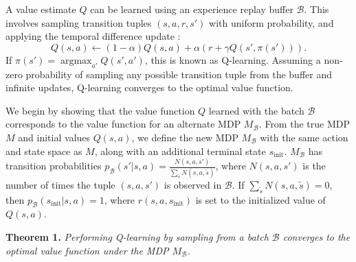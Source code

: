 \documentclass{article}
\newcommand{\y}{\gamma}
\newcommand{\al}{\alpha}
\newcommand{\lp}{\left (}
\newcommand{\rp}{\right )}
\newcommand{\B}{\mathcal{B}}
\DeclareMathOperator*{\argmax}{argmax}
\begin{document}

A value estimate $Q$ can be learned using an experience replay buffer $\B$. This involves sampling transition tuples $(s,a,r,s')$ with uniform probability, and applying the temporal difference update \cite{sutton1988tdlearning, watkins1989qlearning}:
\begin{equation}
Q(s,a) \leftarrow (1 - \al) Q(s,a) + \al \lp r + \y Q(s',\pi(s')) \rp.
\end{equation}
If $\pi(s') = \argmax_{a'} Q(s',a')$, this is known as Q-learning. 
Assuming a non-zero probability of sampling any possible transition tuple from the buffer and infinite updates, Q-learning converges to the optimal value function. 

We begin by showing that the value function $Q$ learned with the batch $\B$ corresponds to the value function for an alternate MDP $M_\B$. From the true MDP $M$ and initial values $Q(s,a)$, we define the new MDP $M_\B$ with the same action and state space as $M$, along with an additional terminal state $s_\text{init}$. $M_\B$ has transition probabilities $p_\B(s'|s,a) = \frac{N(s,a,s')}{\sum_{\tilde s} N(s,a,\tilde s)}$, where $N(s,a,s')$ is the number of times the tuple $(s,a,s')$ is observed in $\B$. If $\sum_{\tilde s} N(s,a,\tilde s) = 0$, then $p_\B(s_\text{init}|s,a) = 1$, where $r(s,a,s_\text{init})$ is set to the initialized value of $Q(s,a)$. 

\textbf{Theorem 1.} \textit{Performing Q-learning by sampling from a batch $\B$ converges to the optimal value function under the MDP $M_\B$.} 

\end{document}
